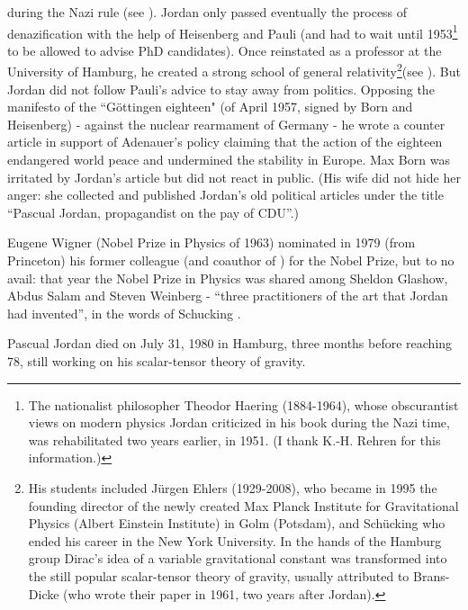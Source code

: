 during the Nazi rule (see \cite{B05}). Jordan only passed eventually the process of denazification with the help of Heisenberg and 
Pauli (and had to wait until 1953\footnote{The nationalist philosopher Theodor Haering (1884-1964), whose 
obscurantist views on modern physics Jordan criticized in his book \cite{J41} during the Nazi time, was rehabilitated 
two years earlier, in 1951. (I thank K.-H. Rehren for this information.)}  to be allowed to advise PhD candidates). Once reinstated 
as a professor at the University of Hamburg, he created a strong school of general relativity\footnote{His students included
J\"urgen Ehlers (1929-2008), who became in 1995 the founding director of the newly created Max Planck Institute for Gravitational 
Physics (Albert Einstein Institute) in Golm (Potsdam), and Sch\"ucking who ended his career in the New York University. In the
hands of the Hamburg group Dirac's idea of a variable gravitational constant was transformed into the still popular scalar-tensor
theory of gravity, usually attributed to Brans-Dicke (who wrote their paper in 1961, two years after Jordan).}(see \cite{E09}). But 
Jordan did not follow Pauli's advice to stay away from politics. Opposing the manifesto of the ``G\"ottingen eighteen" 
(of April 1957, signed by Born and Heisenberg) - against the nuclear rearmament of Germany - he wrote a 
counter article in support of Adenauer's policy claiming that the action of the eighteen endangered world
peace and undermined the stability in Europe. Max Born was irritated by Jordan's article but did
not react in public. (His wife did not hide her anger: she collected and published Jordan's old political
articles under the title ``Pascual Jordan, propagandist on the pay of CDU''.)

Eugene Wigner (Nobel Prize in Physics of 1963) nominated in 1979 (from Princeton) his former
colleague (and coauthor of \cite{JW28}) for the Nobel Prize, but to no avail: that year the Nobel
Prize in Physics was shared among Sheldon Glashow, Abdus Salam and Steven Weinberg - ``three
practitioners of the art that Jordan had invented'', in the words of Schucking \cite{Sch99}.

Pascual Jordan died on July 31, 1980 in Hamburg, three months before reaching 78, 
still working on his scalar-tensor theory of gravity.

\bigskip

